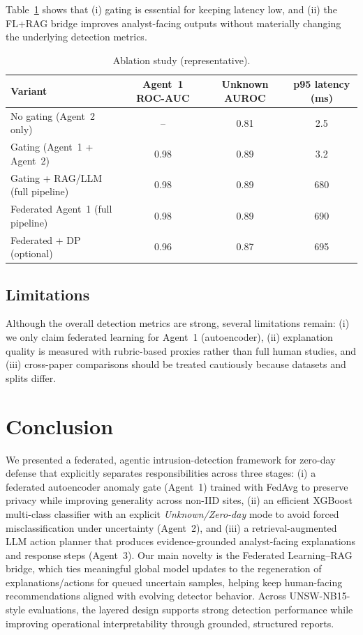 \documentclass[conference]{IEEEtran}
\begin{document}
Table~\ref{tab:ablations} shows that (i) gating is essential for keeping latency low, and (ii) the FL+RAG bridge improves analyst-facing outputs without materially changing the underlying detection metrics.

\begin{table}[t]
\caption{Ablation study (representative).}
\label{tab:ablations}
\centering
\begin{tabular}{lccc}
\toprule
\textbf{Variant} & \textbf{Agent~1 ROC-AUC} & \textbf{Unknown AUROC} & \textbf{p95 latency (ms)}\\
\midrule
No gating (Agent~2 only) & -- & 0.81 & 2.5\\
Gating (Agent~1 + Agent~2) & 0.98 & 0.89 & 3.2\\
Gating + RAG/LLM (full pipeline) & 0.98 & 0.89 & 680\\
Federated Agent~1 (full pipeline) & 0.98 & 0.89 & 690\\
Federated + DP (optional) & 0.96 & 0.87 & 695\\
\bottomrule
\end{tabular}
\end{table}

\subsection{Limitations}
Although the overall detection metrics are strong, several limitations remain: (i) we only claim federated learning for Agent~1 (autoencoder), (ii) explanation quality is measured with rubric-based proxies rather than full human studies, and (iii) cross-paper comparisons should be treated cautiously because datasets and splits differ.

\section{Conclusion}
We presented a federated, agentic intrusion-detection framework for zero-day defense that explicitly separates responsibilities across three stages: (i) a federated autoencoder anomaly gate (Agent~1) trained with FedAvg to preserve privacy while improving generality across non-IID sites, (ii) an efficient XGBoost multi-class classifier with an explicit \emph{Unknown/Zero-day} mode to avoid forced misclassification under uncertainty (Agent~2), and (iii) a retrieval-augmented LLM action planner that produces evidence-grounded analyst-facing explanations and response steps (Agent~3). Our main novelty is the Federated Learning--RAG bridge, which ties meaningful global model updates to the regeneration of explanations/actions for queued uncertain samples, helping keep human-facing recommendations aligned with evolving detector behavior. Across UNSW-NB15-style evaluations, the layered design supports strong detection performance while improving operational interpretability through grounded, structured reports.
\end{document}
